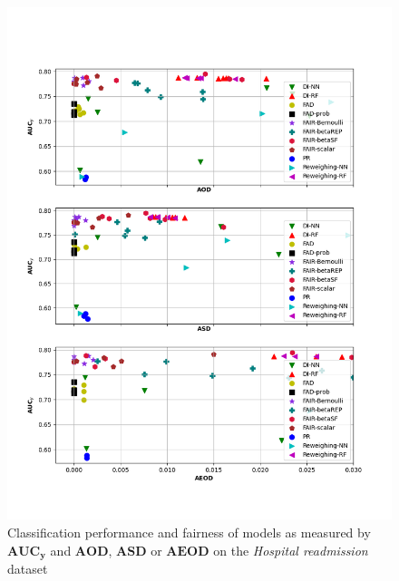 \documentclass[preprint,12pt]{elsarticle}
\begin{document}
\begin{figure}
	\center
	\includegraphics[angle=0, width=1\textwidth]{Readmission_all.png}
	\captionsetup{justification=centering}
	\caption{Classification performance and fairness of models as measured by $\mathbf{AUC_y}$ and $\mathbf{AOD}$, $\mathbf{ASD}$ or $\mathbf{AEOD}$ on the \textit{Hospital readmission} dataset}
	\label{fig:Readmission all}
	\vskip -0.2in
\end{figure}
\end{document}
